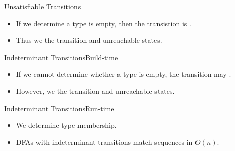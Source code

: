 



\newsavebox\classbox
\begin{lrbox}{\classbox}
  \begin{minipage}{5cm}
    
  \end{minipage}
\end{lrbox}

\begin{frame}{Unsatisfiable Transitions}

  \scalebox{0.8}{}
  \begin{itemize}
  \item   If we determine a type is empty, then the transistion is .
  \item Thus we  the transition and unreachable states.

  \end{itemize}
\end{frame}

\begin{frame}{Indeterminant Transitions}{Build-time}

  \scalebox{0.8}{}

  \begin{itemize}
  \item   If we cannot determine whether a type is empty, the transition may
    . 
  \item  However, we     the transition and unreachable states.
  \end{itemize}
\end{frame}


\begin{frame}{Indeterminant Transitions}{Run-time}

  \scalebox{0.8}{}

  \begin{itemize}
    \item We  determine type membership.
    \item DFAs with indeterminant transitions 
      match sequences in $O(n)$.
  \end{itemize}
\end{frame}


